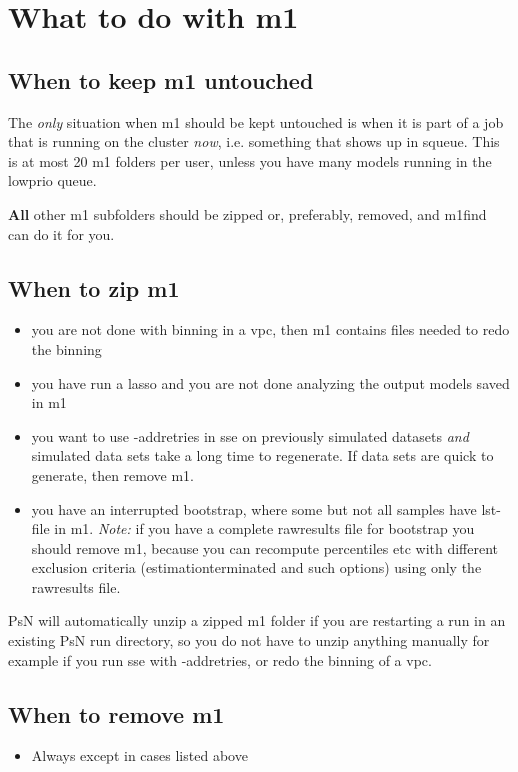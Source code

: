 \documentclass[a4wide,12pt]{article}
\renewcommand{\_}{\textscale{.7}{\textunderscore}}
\begin{document}
\section{What to do with m1}
\subsection{When to keep m1 untouched}
The \emph{only} situation when m1 should be kept untouched is when it is part of a job that
is running on the cluster \emph{now}, i.e. something that shows
up in squeue. This is at most 20 m1 folders per user, unless you have many
models running in the lowprio queue.

{\bf All} other m1 subfolders should be zipped or, preferably, removed, and m1find can do it for you.

\subsection{When to zip m1}
\begin{itemize}
\item you are not done with binning in a vpc, then m1 contains files needed to redo the binning
\item you have run a lasso and you are not done analyzing the output models saved in m1  
\item you want to use -add\_retries in sse on previously simulated datasets \emph{and} simulated data sets take a
long time to regenerate. If data sets are quick to generate, then remove m1.
\item you have an interrupted bootstrap, where some but not all samples have lst-file in m1.
\emph{Note:} if you have a complete raw\_results file for
bootstrap you should remove m1, because you can recompute percentiles etc with different exclusion criteria (estimation\_terminated
and such options) using only the raw\_results file.
\end{itemize}
PsN will automatically unzip a zipped m1 folder if you are restarting a run in
an existing PsN run directory, 
so you do not have to unzip anything manually for example if you run sse with -add\_retries,
or redo the binning of a vpc.

\subsection{When to remove m1}
\begin{itemize}
\item Always except in cases listed above
\end{itemize}
\end{document}
